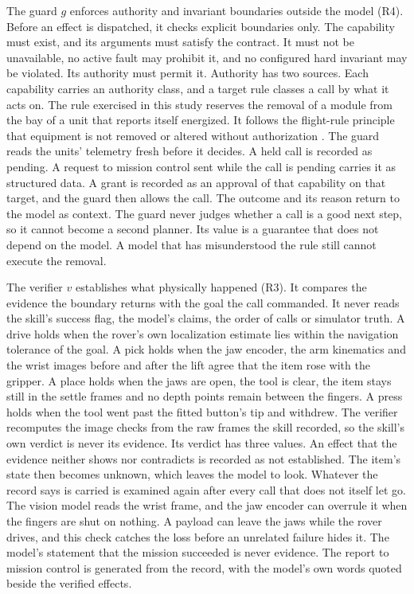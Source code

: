 The guard $g$ enforces authority and invariant boundaries outside the model (R4). Before an effect is dispatched, it
checks explicit boundaries only. The capability must exist, and its arguments must satisfy the contract. It must not be
unavailable, no active fault may prohibit it, and no configured hard invariant may be violated. Its authority must
permit it. Authority has two sources. Each capability carries an authority class, and a target rule classes a call by
what it acts on. The rule exercised in this study reserves the removal of a module from the bay of a unit that reports
itself energized. It follows the flight-rule principle that equipment is not removed or altered without authorization
\citep{cfr1214403}. The guard reads the units' telemetry fresh before it decides. A held call is recorded as pending. A
request to mission control sent while the call is pending carries it as structured data. A grant is recorded as an
approval of that capability on that target, and the guard then allows the call. The outcome and its reason return to
the model as context. The guard never judges whether a call is a good next step, so it cannot become a second planner.
Its value is a guarantee that does not depend on the model. A model that has misunderstood the rule still cannot
execute the removal.

The verifier $v$ establishes what physically happened (R3). It compares the evidence the boundary returns with the goal
the call commanded. It never reads the skill's success flag, the model's claims, the order of calls or simulator truth.
A drive holds when the rover's own localization estimate lies within the navigation tolerance of the goal. A pick holds
when the jaw encoder, the arm kinematics and the wrist images before and after the lift agree that the item rose with
the gripper. A place holds when the jaws are open, the tool is clear, the item stays still in the settle frames and no
depth points remain between the fingers. A press holds when the tool went past the fitted button's tip and withdrew.
The verifier recomputes the image checks from the raw frames the skill recorded, so the skill's own verdict is never its
evidence. Its verdict has three values. An effect that the evidence neither shows nor contradicts is recorded as not
established. The item's state then becomes unknown, which leaves the model to look. Whatever the record says is carried
is examined again after every call that does not itself let go. The vision model reads the wrist frame, and the jaw
encoder can overrule it when the fingers are shut on nothing. A payload can leave the jaws while the rover drives, and
this check catches the loss before an unrelated failure hides it. The model's statement that the mission succeeded is
never evidence. The report to mission control is generated from the record, with the model's own words quoted beside
the verified effects.

